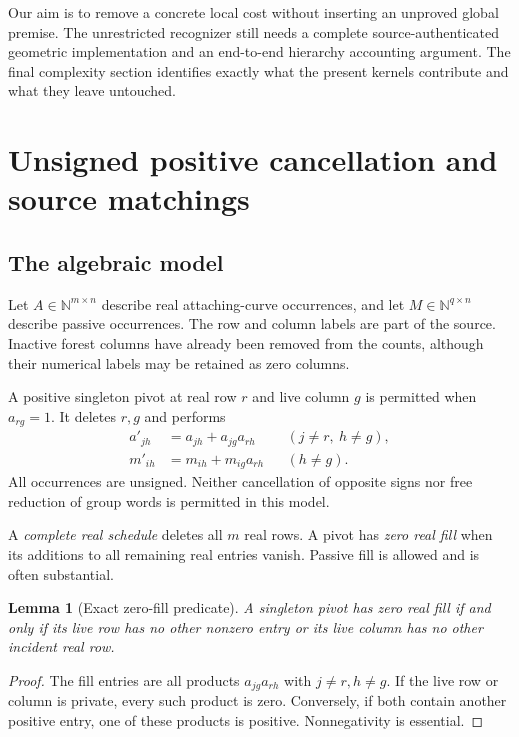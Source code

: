 \documentclass[11pt,letterpaper]{article}
\newtheorem{lemma}[theorem]{Lemma}
\theoremstyle{definition}
\newcommand{\N}{\mathbb N}
\begin{document}
Our aim is to remove a concrete local cost without inserting an unproved global premise. The unrestricted recognizer still needs a complete source-authenticated geometric implementation and an end-to-end hierarchy accounting argument. The final complexity section identifies exactly what the present kernels contribute and what they leave untouched.

\section{Unsigned positive cancellation and source matchings}
\subsection{The algebraic model}
Let $A\in\N^{m\times n}$ describe real attaching-curve occurrences, and let $M\in\N^{q\times n}$ describe passive occurrences. The row and column labels are part of the source. Inactive forest columns have already been removed from the counts, although their numerical labels may be retained as zero columns.

A positive singleton pivot at real row $r$ and live column $g$ is permitted when $a_{rg}=1$. It deletes $r,g$ and performs
\begin{align}
 a'_{jh}&=a_{jh}+a_{jg}a_{rh} &&(j\ne r,\ h\ne g),\label{eq:realpivot}\\
 m'_{ih}&=m_{ih}+m_{ig}a_{rh} &&(h\ne g).\label{eq:passivepivot}
\end{align}
All occurrences are unsigned. Neither cancellation of opposite signs nor free reduction of group words is permitted in this model.

A \emph{complete real schedule} deletes all $m$ real rows. A pivot has \emph{zero real fill} when its additions to all remaining real entries vanish. Passive fill is allowed and is often substantial.

\begin{lemma}[Exact zero-fill predicate]\label{lem:zerofill}
A singleton pivot has zero real fill if and only if its live row has no other nonzero entry or its live column has no other incident real row.
\end{lemma}
\begin{proof}
The fill entries are all products $a_{jg}a_{rh}$ with $j\ne r,h\ne g$. If the live row or column is private, every such product is zero. Conversely, if both contain another positive entry, one of these products is positive. Nonnegativity is essential.
\end{proof}
\end{document}
